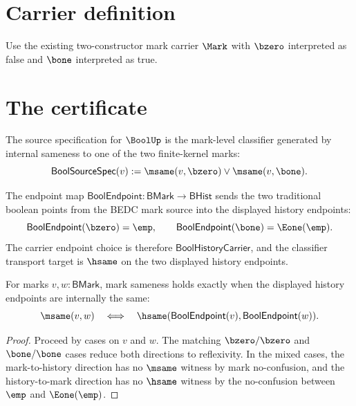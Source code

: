 \section{Carrier definition}

\begin{definition}
\label{def:bool-carrier}
Use the existing two-constructor mark carrier \(\Mark\) with \(\bzero\) interpreted as false and \(\bone\) interpreted as true.
\end{definition}

\section{The certificate}

\begin{definition}
\label{def:bool-source-specification}
The source specification for \(\BoolUp\) is the mark-level classifier generated by internal sameness to one of the two finite-kernel marks:
$$
  \mathsf{BoolSourceSpec}(v)
  :=
  \msame(v,\bzero)\lor\msame(v,\bone).
$$
\end{definition}

\begin{definition}
\label{def:bool-endpoint-bridge}
The endpoint map $\mathsf{BoolEndpoint}:\mathsf{BMark}\to\mathsf{BHist}$ sends the two traditional boolean points from the BEDC mark source into the displayed history endpoints:
$$
  \mathsf{BoolEndpoint}(\bzero)=\emp,\qquad
  \mathsf{BoolEndpoint}(\bone)=\Eone(\emp).
$$
The carrier endpoint choice is therefore $\mathsf{BoolHistoryCarrier}$, and the classifier transport target is $\hsame$ on the two displayed history endpoints.
\end{definition}

\begin{theorem}
\label{thm:bool-endpoint-bridge-exactness}
For marks $v,w:\mathsf{BMark}$, mark sameness holds exactly when the displayed history endpoints are internally the same:
$$
  \msame(v,w)
  \quad\Longleftrightarrow\quad
  \hsame(\mathsf{BoolEndpoint}(v),\mathsf{BoolEndpoint}(w)).
$$
\end{theorem}
\begin{proof}
Proceed by cases on $v$ and $w$. The matching $\bzero/\bzero$ and $\bone/\bone$ cases reduce both directions to reflexivity. In the mixed cases, the mark-to-history direction has no $\msame$ witness by mark no-confusion, and the history-to-mark direction has no $\hsame$ witness by the no-confusion between $\emp$ and $\Eone(\emp)$.
\end{proof}

